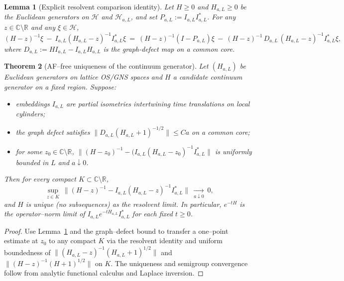 \documentclass[11pt]{amsart}
\theoremstyle{plain}
\newtheorem{theorem}{Theorem}[section]
\newtheorem{lemma}[theorem]{Lemma}
\theoremstyle{definition}
\theoremstyle{remark}
\begin{document}
\begin{lemma}[Explicit resolvent comparison identity]\label{lem:U2-comparison}
Let $H\ge 0$ and $H_{a,L}\ge 0$ be the Euclidean generators on $\mathcal H$ and $\mathcal H_{a,L}$, and set $P_{a,L}:=I_{a,L}I_{a,L}^*$. For any $z\in\mathbb C\setminus\mathbb R$ and any $\xi\in\mathcal H$,
\[
  (H-z)^{-1}\xi\ -\ I_{a,L}(H_{a,L}-z)^{-1}I_{a,L}^*\xi
  \
  =\ (H-z)^{-1}(I-P_{a,L})\xi\ -\ (H-z)^{-1}\,D_{a,L}\,(H_{a,L}-z)^{-1}I_{a,L}^*\xi,
\]
where $D_{a,L}:=H I_{a,L}-I_{a,L}H_{a,L}$ is the graph-defect map on a common core.
\end{lemma}
\begin{theorem}[AF–free uniqueness of the continuum generator]\label{thm:U2-nrc-unique}
Let $(H_{a,L})$ be Euclidean generators on lattice OS/GNS spaces and $H$ a candidate continuum generator on a fixed region. Suppose:
\begin{itemize}
  \item embeddings $I_{a,L}$ are partial isometries intertwining time translations on local cylinders;
  \item the graph defect satisfies $\|D_{a,L}(H_{a,L}+1)^{-1/2}\|\le C a$ on a common core;
  \item for some $z_0\in\mathbb C\setminus\mathbb R$, $\|(H-z_0)^{-1}-(I_{a,L}(H_{a,L}-z_0)^{-1}I_{a,L}^*\|$ is uniformly bounded in $L$ and $a\downarrow 0$.
\end{itemize}
Then for every compact $K\subset\mathbb C\setminus\mathbb R$,
\[
  \sup_{z\in K}\ \big\|(H-z)^{-1} - I_{a,L}(H_{a,L}-z)^{-1}I_{a,L}^*\big\|\ \xrightarrow[a\downarrow 0]{\ }\ 0,
\]
and $H$ is unique (no subsequences) as the resolvent limit. In particular, $e^{-tH}$ is the operator–norm limit of $I_{a,L} e^{-tH_{a,L}} I_{a,L}^*$ for each fixed $t\ge 0$.
\end{theorem}
\begin{proof}
Use Lemma~\ref{lem:U2-comparison} and the graph–defect bound to transfer a one–point estimate at $z_0$ to any compact $K$ via the resolvent identity and uniform boundedness of $\|(H_{a,L}-z)^{-1}(H_{a,L}+1)^{1/2}\|$ and $\|(H-z)^{-1}(H+1)^{1/2}\|$ on $K$. The uniqueness and semigroup convergence follow from analytic functional calculus and Laplace inversion.
\end{proof}
\end{document}
